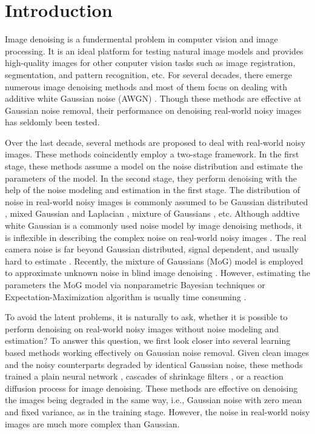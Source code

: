 \documentclass[10pt,twocolumn,letterpaper]{article}
\begin{document}
\section{Introduction}
Image denoising is a fundermental problem in computer vision and image processing. It is an ideal platform for testing natural image models and provides high-quality images for other conputer vision tasks such as image registration, segmentation, and pattern recognition, etc. For several decades, there emerge numerous image denoising methods and most of them focus on dealing with additive white Gaussian noise (AWGN) \cite{nlm,foe,ksvd,bm3d,lssc,epll,burger2012image,wnnm,csf,pgpd,chen2015learning}. Though these methods are effective at Gaussian noise removal, their performance on denoising real-world noisy images has seldomly been tested. 

Over the last decade, several methods \cite{fullyblind,rabie2005robust,Liu2008,almapg,noiseclinic,Zhu_2016_CVPR,crosschannel2016} are proposed to deal with real-world noisy images. These methods coincidently employ a two-stage framework. In the first stage, these methods assume a model on the noise distribution and estimate the parameters of the model. In the second stage, they perform denoising with the help of the noise modeling and estimation in the first stage. The distribution of noise in real-world noisy images is commonly assumed to be Gaussian distributed \cite{fullyblind,rabie2005robust,Liu2008,noiseclinic,crosschannel2016}, mixed Gaussian and Laplacian \cite{almapg}, mixture of Gaussians \cite{Zhu_2016_CVPR}, etc. Although addtive white Gaussian is a commonly used noise model by image denoising methods, it is inflexible in describing the complex noise on real-world noisy images \cite{Liu2008,noiseclinic}. The real camera noise is far beyond Gaussian distributed, signal dependent, and usually hard to estimate \cite{crosschannel2016}. Recently, the mixture of Gaussians (MoG) model is employed to approximate unknown noise in blind image denoising \cite{Zhu_2016_CVPR}. However, estimating the parameters the MoG model via nonparametric Bayesian techniques \cite{Zhu_2016_CVPR} or Expectation-Maximization algorithm \cite{em} is usually time consuming \cite{Bishop}. 

To avoid the latent problems, it is naturally to ask, whether it is possible to perform denoising on real-world noisy images without noise modeling and estimation? To answer this question, we first look closer into several learning based methods working effectively on Gaussian noise removal. Given clean images and the noisy counterparts degraded by identical Gaussian noise, these methods trained a plain neural network \cite{burger2012image}, cascades of shrinkage filters \cite{csf}, or a reaction diffusion process \cite{chen2015learning} for image denoising. These methods are effective on denoising the images being degraded in the same way, i.e., Gaussian noise with zero mean and fixed variance, as in the training stage. However, the noise in real-world noisy images are much more complex than Gaussian. 
\end{document}
